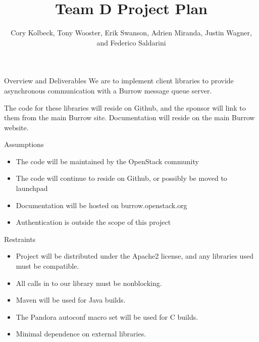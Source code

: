 \documentclass{beamer}
\begin{document}
\title{Team D Project Plan}
\author[CK, TW, ES, AM, JW, \& FS]{Cory Kolbeck, Tony Wooster, Erik Swanson, Adrien Miranda, Justin Wagner, and Federico Saldarini}

\begin{frame}
  \titlepage
\end{frame}

\begin{frame}{Overview and Deliverables}
  We are to implement client libraries to provide asynchronous communication with a Burrow message queue server.

  The code for these libraries will reside on Github, and the sponsor will link to them from the main Burrow site. 
  Documentation will reside on the main Burrow website. 
\end{frame}

\begin{frame}{Assumptions}

  \begin{itemize}
  \item The code will be maintained by the OpenStack community
  \item The code will continue to reside on Github, or possibly be moved to launchpad
  \item Documentation will be hosted on burrow.openstack.org
  \item Authentication is outside the scope of this project
  \end{itemize}

\end{frame}

\begin{frame}{Restraints}

  \begin{itemize}
  \item Project will be distributed under the Apache2 license, and any libraries used must be compatible.
  \item All calls in to our library must be nonblocking.
  \item Maven will be used for Java builds.
  \item The Pandora autoconf macro set will be used for C builds.
  \item Minimal dependence on external libraries.
  \end{itemize}

\end{frame}
\end{document}

